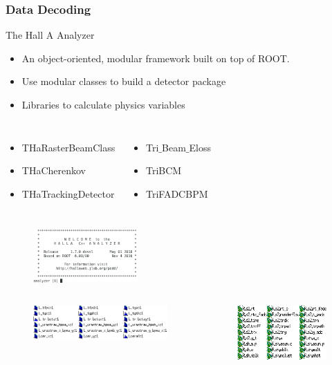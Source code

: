 \documentclass{beamer}
\begin{document}
\begin{frame}
\frametitle{Data Decoding}
\vspace{-5pt}
\begin{block}{The Hall A Analyzer}
	\begin{itemize}	
		\item An object-oriented, modular framework built on top of ROOT. 
		\item Use modular classes to build a detector package 
		\item Libraries to calculate physics variables 
	\end{itemize}
	\begin{columns}
		\begin{itemize}
			\item THaRasterBeamClass
			\item THaCherenkov
			\item THaTrackingDetector
		\end{itemize}
		\begin{itemize}
			\item Tri$\_$Beam$\_$Eloss
			\item TriBCM
			\item TriFADCBPM
		\end{itemize}		
	\end{columns}
\end{block}
\vspace{-190pt}
\begin{figure}
	\includegraphics[width=4cm]{../images/ana}
\end{figure}
\vspace{90pt}
\begin{columns}
	\column{0.5\textwidth}
	\begin{figure}
		\includegraphics[width=6cm]{../images/histos}
	\end{figure}
	\column{0.5\textwidth}
	\begin{figure}
		\includegraphics[width=4cm]{../images/branches}
	\end{figure}
\end{columns}

\end{frame}
\end{document}
